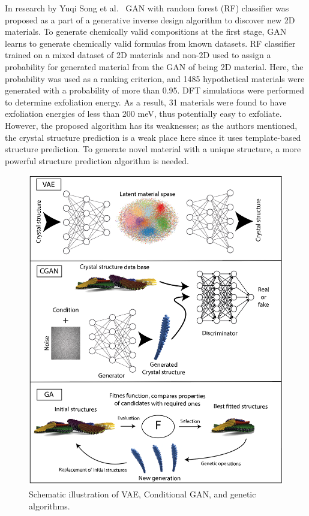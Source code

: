 In research by Yuqi Song et al.~\cite{song2021computational} GAN with random forest (RF) classifier was proposed as a part of a generative inverse design algorithm to discover new 2D materials. To generate chemically valid compositions at the first stage, GAN learns to generate chemically valid formulas from known datasets. RF classifier trained on a mixed dataset of 2D materials and non-2D used to assign a probability for generated material from the GAN of being 2D material. Here, the probability was used as a ranking criterion, and 1485 hypothetical materials were generated with a probability of more than 0.95. DFT simulations were performed to determine exfoliation energy. As a result, 31 materials were found to have exfoliation energies of less than 200 meV, thus potentially easy to exfoliate. However, the proposed algorithm has its weaknesses; as the authors mentioned, the crystal structure prediction is a weak place here since it uses template-based structure prediction. To generate novel material with a unique structure, a more powerful structure prediction algorithm is needed.

\begin{figure}[H]
	\noindent
	\centering
	\includegraphics[width=\textwidth]{figures/Generative_models.png}
	\caption{Schematic illustration of VAE, Conditional GAN, and genetic algorithms.}
	\label{fig:generative-models}
\end{figure}

